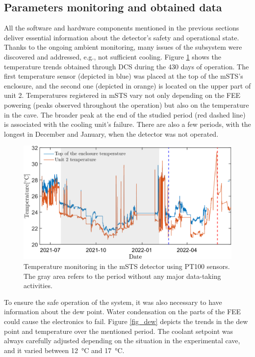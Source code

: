 \subsection{Parameters monitoring and obtained data}
All the software and hardware components mentioned in the previous sections deliver essential information about the detector's safety and operational state. Thanks to the ongoing ambient monitoring, many issues of the subsystem were discovered and addressed, e.g., not sufficient cooling. Figure \ref{fig_temp} shows the temperature trends obtained through \gls{DCS} during the 430 days of operation. The first temperature sensor (depicted in blue) was placed at the top of the \gls{mSTS}'s enclosure, and the second one (depicted in orange) is located on the upper part of unit 2. Temperatures registered in \gls{mSTS} vary not only depending on the \gls{FEE} powering (peaks observed throughout the operation) but also on the temperature in the cave. The broader peak at the end of the studied period (red dashed line) is associated with the cooling unit's failure. There are also a few periods, with the longest in December and January, when the detector was not operated. 

\begin{figure}[!h]
\centering
\includegraphics[width=0.9\columnwidth]{Chapter6/DCS/images/temp2.png}
\caption{Temperature monitoring in the \gls{mSTS} detector using PT100 sensors. The gray area refers to the period without any major data-taking activities.}
\label{fig_temp}
\end{figure}
\newpage
To ensure the safe operation of the system, it was also necessary to have information about the dew point. Water condensation on the parts of the \gls{FEE} could cause the electronics to fail. Figure \ref{fig_dew} depicts the trends in the dew point and temperature over the mentioned period. The coolant setpoint was always carefully adjusted depending on the situation in the experimental cave, and it varied between \SI{12}{\celsius} and \SI{17}{\celsius}.

